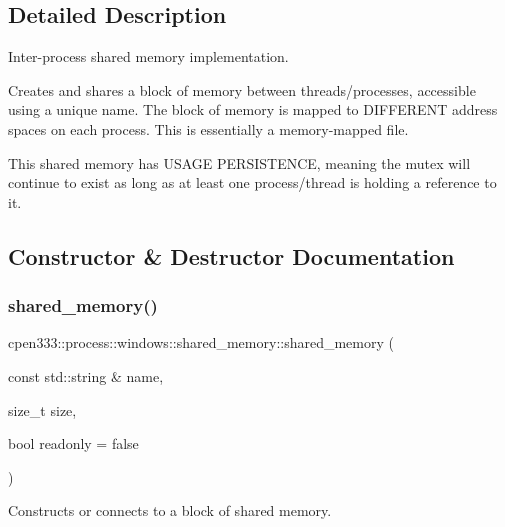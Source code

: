 \subsection{Detailed Description}
Inter-\/process shared memory implementation. 

Creates and shares a block of memory between threads/processes, accessible using a unique name. The block of memory is mapped to D\+I\+F\+F\+E\+R\+E\+NT address spaces on each process. This is essentially a memory-\/mapped file.

This shared memory has U\+S\+A\+GE P\+E\+R\+S\+I\+S\+T\+E\+N\+CE, meaning the mutex will continue to exist as long as at least one process/thread is holding a reference to it. 

\subsection{Constructor \& Destructor Documentation}
\mbox{\label{classcpen333_1_1process_1_1windows_1_1shared__memory_a3a2044ba961f9fc394e166273a3efa20}} 
\subsubsection{\texorpdfstring{shared\+\_\+memory()}{shared\_memory()}}
{\footnotesize\ttfamily cpen333\+::process\+::windows\+::shared\+\_\+memory\+::shared\+\_\+memory (\begin{DoxyParamCaption}\item[{const std\+::string \&}]{name,  }\item[{size\+\_\+t}]{size,  }\item[{bool}]{readonly = {\ttfamily false} }\end{DoxyParamCaption})\hspace{0.3cm}{\ttfamily [inline]}}



Constructs or connects to a block of shared memory. 


